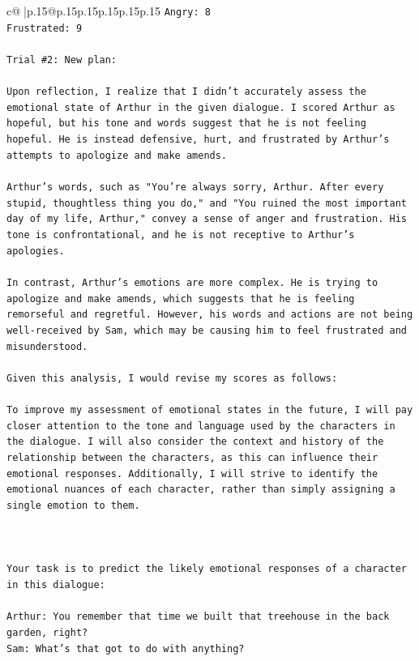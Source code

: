 \documentclass{article}
\begin{document}
{\begin{supertabular}{c@{$\;$}|p{.15\linewidth}@{}p{.15\linewidth}p{.15\linewidth}p{.15\linewidth}p{.15\linewidth}p{.15\linewidth}}
{{{\texttt{Angry: 8} \\
\texttt{Frustrated: 9} \\
\\ 
\texttt{Trial \#2: New plan: } \\
\\ 
\texttt{Upon reflection, I realize that I didn't accurately assess the emotional state of Arthur in the given dialogue. I scored Arthur as hopeful, but his tone and words suggest that he is not feeling hopeful. He is instead defensive, hurt, and frustrated by Arthur's attempts to apologize and make amends. } \\
\\ 
\texttt{Arthur's words, such as "You're always sorry, Arthur. After every stupid, thoughtless thing you do," and "You ruined the most important day of my life, Arthur," convey a sense of anger and frustration. His tone is confrontational, and he is not receptive to Arthur's apologies.} \\
\\ 
\texttt{In contrast, Arthur's emotions are more complex. He is trying to apologize and make amends, which suggests that he is feeling remorseful and regretful. However, his words and actions are not being well{-}received by Sam, which may be causing him to feel frustrated and misunderstood.} \\
\\ 
\texttt{Given this analysis, I would revise my scores as follows:} \\
\\ 
\texttt{To improve my assessment of emotional states in the future, I will pay closer attention to the tone and language used by the characters in the dialogue. I will also consider the context and history of the relationship between the characters, as this can influence their emotional responses. Additionally, I will strive to identify the emotional nuances of each character, rather than simply assigning a single emotion to them.} \\
\\ 
\\ 
\\ 
\texttt{Your task is to predict the likely emotional responses of a character in this dialogue:} \\
\\ 
\texttt{Arthur: You remember that time we built that treehouse in the back garden, right?} \\
\texttt{Sam: What's that got to do with anything?} \\
}}}
\end{supertabular}}
\end{document}
